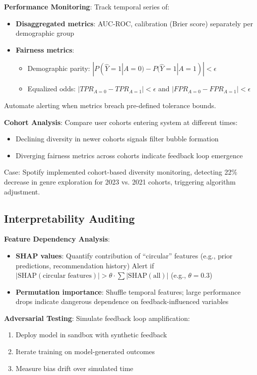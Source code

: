 \documentclass[11pt,a4paper]{article}
\begin{document}
\textbf{Performance Monitoring}:  
Track temporal series of:
\begin{itemize}
    \item \textbf{Disaggregated metrics}: AUC-ROC, calibration (Brier score) separately per demographic group
    \item \textbf{Fairness metrics}:  
    \begin{itemize}
        \item Demographic parity: $|P(\hat{Y}=1|A=0) - P(\hat{Y}=1|A=1)| < \epsilon$  
        \item Equalized odds: $|TPR_{A=0} - TPR_{A=1}| < \epsilon$ and $|FPR_{A=0} - FPR_{A=1}| < \epsilon$
    \end{itemize}
\end{itemize}

Automate alerting when metrics breach pre-defined tolerance bounds.

\textbf{Cohort Analysis}:  
Compare user cohorts entering system at different times:
\begin{itemize}
    \item Declining diversity in newer cohorts signals filter bubble formation
    \item Diverging fairness metrics across cohorts indicate feedback loop emergence
\end{itemize}

Case: Spotify implemented cohort-based diversity monitoring, detecting 22\% decrease in genre exploration for 2023 vs. 2021 cohorts, triggering algorithm adjustment.

\subsection{Interpretability Auditing}

\textbf{Feature Dependency Analysis}:  
\begin{itemize}
    \item \textbf{SHAP values}: Quantify contribution of ``circular'' features (e.g., prior predictions, recommendation history)  
    Alert if $|\text{SHAP}(\text{circular features})| > \theta \cdot \sum|\text{SHAP}(\text{all})|$ (e.g., $\theta=0.3$)
    
    \item \textbf{Permutation importance}: Shuffle temporal features; large performance drops indicate dangerous dependence on feedback-influenced variables
\end{itemize}

\textbf{Adversarial Testing}:  
Simulate feedback loop amplification:
\begin{enumerate}
    \item Deploy model in sandbox with synthetic feedback
    \item Iterate training on model-generated outcomes
    \item Measure bias drift over simulated time
\end{enumerate}
\end{document}
